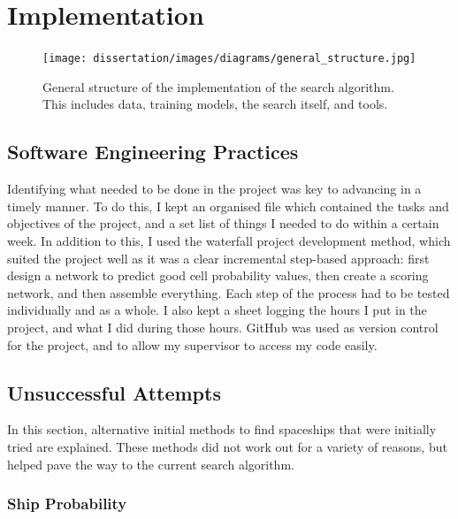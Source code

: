 \documentclass{l4proj}
\begin{document}
\chapter{Implementation}

\begin{figure}[h!]
\centering
\texttt{[image: dissertation/images/diagrams/general\_structure.jpg]} 
\caption{General structure of the implementation of the search algorithm. This includes data, training models, the search itself, and tools.}
\label{fig:subim1}
\end{figure}

\section{Software Engineering Practices}

Identifying what needed to be done in the project was key to advancing in a timely manner. To do this, I kept an organised file which contained the tasks and objectives of the project, and a set list of things I needed to do within a certain week. In addition to this, I used the waterfall project development method, which suited the project well as it was a clear incremental step-based approach: first design a network to predict good cell probability values, then create a scoring network, and then assemble everything. Each step of the process had to be tested individually and as a whole. I also kept a sheet logging the hours I put in the project, and what I did during those hours. GitHub was used as version control for the project, and to allow my supervisor to access my code easily.

\section {Unsuccessful Attempts}

In this section, alternative initial methods to find spaceships that were initially tried are explained. These methods did not work out for a variety of reasons, but helped pave the way to the current search algorithm. 

\subsection{Ship Probability}
\end{document}

